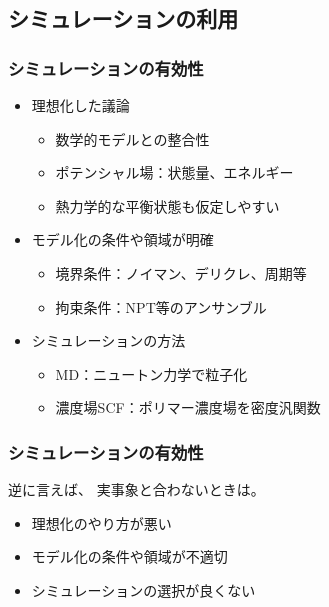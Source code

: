 \documentclass[1４pt, dvipdfmx]{beamer}
\begin{document}
\subsection{シミュレーションの利用}
\begin{frame}\frametitle{シミュレーションの有効性}
\large
\begin{itemize}
	\item
	理想化した議論
	\large
	\begin{itemize}
		\large
		\item
		数学的モデルとの整合性
		\item
		ポテンシャル場：状態量、エネルギー	
		\item
		熱力学的な平衡状態も仮定しやすい
	\end{itemize}
	\item
	モデル化の条件や領域が明確
	\begin{itemize}
		\large
		\item
		境界条件：ノイマン、デリクレ、周期等
		\item
		拘束条件：NPT等のアンサンブル
	\end{itemize}
	\item
	シミュレーションの方法
	\begin{itemize}
		\large
		\item
		MD：ニュートン力学で粒子化
		\item
		濃度場SCF：ポリマー濃度場を密度汎関数		
	\end{itemize}
\end{itemize}
\end{frame}
\begin{frame}\frametitle{シミュレーションの有効性}

\begin{alertblock}{逆に言えば、}
実事象と合わないときは。
\begin{itemize}
	\item
	理想化のやり方が悪い
	\item
	モデル化の条件や領域が不適切
	\item
	シミュレーションの選択が良くない
\end{itemize}
\end{alertblock}
\end{frame}
\end{document}
